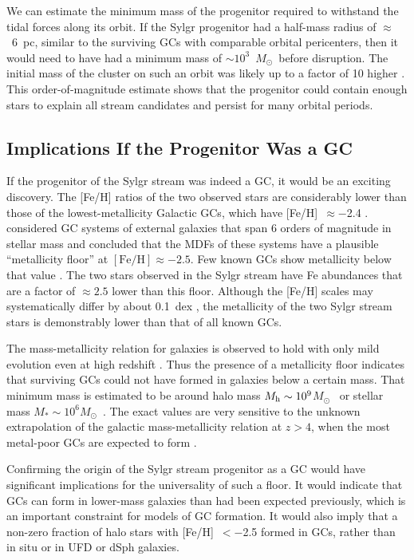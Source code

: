 \documentclass[twocolumn,tighten]{aastex62}
\newcommand{\feh}{{\mathrm{[Fe/H]}}}
\newcommand{\msun}{\mbox{$M_{\odot}$}}
\begin{document}
We can estimate the minimum mass of the progenitor 
required to withstand the tidal forces along its orbit. 
If the Sylgr progenitor had a half-mass radius of $\approx$~6~pc,
similar to the surviving GCs with comparable orbital pericenters,
then it would need to have had a minimum mass of 
$\sim 10^3$~\msun\ before disruption.
The initial mass of the cluster on such an orbit 
was likely up to a factor of 10 higher \citep{baumgardt_etal19}. 
This order-of-magnitude estimate shows that the progenitor 
could contain enough stars 
to explain all stream candidates 
and persist for many orbital periods.


\subsection{Implications If the Progenitor Was a GC}
\label{sec:implications}


If the progenitor of the Sylgr stream was indeed a GC, 
it would be an exciting discovery. 
The [Fe/H] ratios of the two observed stars are
considerably lower than those of
the lowest-metallicity Galactic GCs,
which have [Fe/H]~$\approx -$2.4 \citep[e.g.,][]{harris96}.
\citet{beasley19} considered GC systems of external galaxies 
that span 6 orders of magnitude in stellar mass and
concluded that the MDFs of these systems have a plausible 
``metallicity floor'' at $\feh\approx -2.5$.
Few known GCs show metallicity below that value \citep{forbes_etal18}.
The two stars observed in the Sylgr stream have Fe abundances that are
a factor of $\approx 2.5$ lower than this floor.
Although the [Fe/H] scales may systematically differ by about 0.1~dex 
\citep[e.g.,][]{carretta09feh},
the metallicity of the two Sylgr stream stars
is demonstrably lower than that of all known GCs.~

The mass-metallicity relation for galaxies is observed to hold with only mild evolution even at high redshift \citep[e.g.,][]{maiolino_mannucci19}. Thus the presence of a metallicity floor indicates that surviving GCs could not have formed in galaxies below a certain mass. That minimum mass is estimated to be around halo mass $M_{\rm h} \sim 10^9$\msun\ \citep{choksi_etal18} or stellar mass $M_* \sim 10^6$\msun\ \citep{kruijssen19}. The exact values are very sensitive to the unknown extrapolation of the galactic mass-metallicity relation at $z>4$, when the most metal-poor GCs are expected to form \citep[e.g.,][]{muratov_gnedin10, li_gnedin14, choksi_gnedin19}.

Confirming the origin of the Sylgr stream progenitor as a GC would have significant implications for the universality of such a floor. It would indicate that GCs can form in lower-mass galaxies than had been expected previously, which is an important constraint for models of GC formation. It would also imply that a non-zero fraction of halo stars with [Fe/H]~$< -$2.5 formed in GCs, rather than in situ or in UFD or dSph galaxies.
\end{document}
